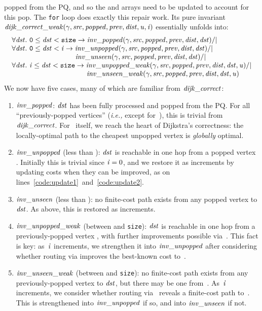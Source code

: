 popped from the PQ, and so the  and  arrays need to be
updated to account for this pop. The \texttt{for} loop does exactly this repair work.
Its pure invariant
$\mathit{dijk\_correct\_weak}(\gamma, \mathit{src}, \mathit{popped}, \mathit{prev}, \mathit{dist}, \mathit{u}, \mathit{i})$ essentially unfolds into:
\[
\begin{array}{l}
\forall \m{dst}.~\texttt{0} \le \m{dst} < \texttt{size} -> \m{inv\_popped}(\gamma, \m{src}, \m{popped}, \m{prev}, \m{dist}, \m{dst}) /| \null \\
\forall \m{dst}.~\texttt{0} \le \m{dst} < \m{i} -> \m{inv\_unpopped}(\gamma, \m{src}, \m{popped}, \m{prev}, \m{dist}, \m{dst}) /| \null \\
\hspace{9em}\m{inv\_unseen}(\gamma, \m{src}, \m{popped}, \m{prev}, \m{dist}, \m{dst}) /| \null \\
\forall \m{dst}.~\m{i} \le \m{dst} < \texttt{size} -> \m{inv\_unpopped\_weak}(\gamma, \m{src}, \m{popped}, \m{prev}, \m{dist}, \m{dst}, \m{u}) /| \null \\
\hspace{10.6em}\m{inv\_unseen\_weak}(\gamma, \m{src}, \m{popped}, \m{prev}, \m{dist}, \m{dst}, \m{u})
\end{array}
\]
We now have five cases, many of which are familiar from $\mathit{dijk\_correct}$:
\begin{enumerate}
\item $\mathit{inv\_popped}$: $\mathit{dst}$ has been fully processed and
popped from the PQ.  For all ``previously-popped vertices'' (\emph{i.e., }except for~),
this is trivial from $\mathit{dijk\_correct}$. For~ itself, we reach the heart of Dijkstra's correctness:
the locally-optimal path to the cheapest unpopped vertex is
\emph{globally} optimal.
\item $\mathit{inv\_unpopped}$ (less than ): $\mathit{dst}$ is reachable in
one hop from a popped vertex . Initially this is trivial since $\mathit{i}=0$, and we restore it as  increments by updating costs when they can be improved, as on lines~\ref{code:update1}~and~\ref{code:update2}.
\item $\mathit{inv\_unseen}$ (less than ): no finite-cost path exists from any popped vertex to $\mathit{dst}$. As above, this is restored as  increments.
\item $\mathit{inv\_unpopped\_weak}$ (between  and \texttt{size}):
$\mathit{dst}$ is reachable in one hop from a previously-popped vertex ,
with further improvements possible via~.
This fact is key: as~$\mathit{i}$ increments, we strengthen it
into $\mathit{inv\_unpopped}$ after considering whether routing via
 improves the best-known cost to~.
\item $\mathit{inv\_unseen\_weak}$ (between  and \texttt{size}):
no finite-cost path exists from any previously-popped vertex to
$\mathit{dst}$, but there may be one from~.
As~$\mathit{i}$ increments, we consider whether routing via~
reveals a finite-cost path to~.
This is strengthened into
$\mathit{inv\_unpopped}$ if so, and into
$\mathit{inv\_unseen}$ if not.
\end{enumerate}
